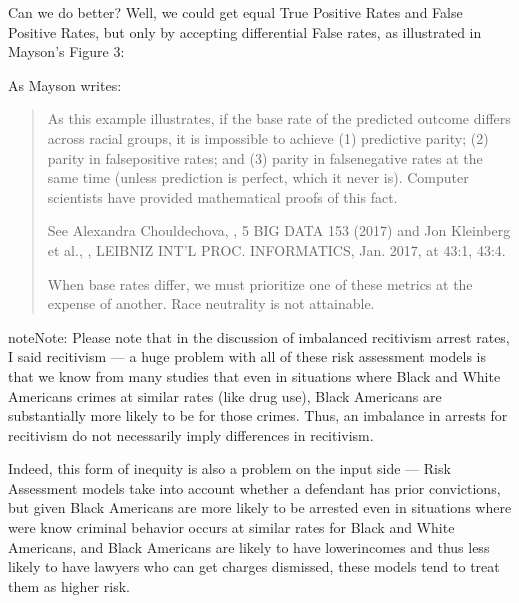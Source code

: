 \documentclass[letterpaper,10pt,english]{jupyterBook}
\begin{document}
\sphinxAtStartPar
Can we do better? Well, we could get equal True Positive Rates and False Positive Rates, but only by accepting differential False  rates, as illustrated in Mayson’s Figure 3:

\sphinxAtStartPar
{}

\sphinxAtStartPar
As Mayson writes:
\begin{quote}

\sphinxAtStartPar
As this example illustrates, if the base rate of the predicted outcome differs across racial groups, it is impossible to achieve (1) predictive parity; (2) parity in false\sphinxhyphen{}positive rates; and (3) parity in false\sphinxhyphen{}negative rates at the same time (unless prediction is perfect, which it never is). Computer scientists have provided mathematical proofs of this fact.%
\begin{footnote}[4]\sphinxAtStartFootnote
See Alexandra Chouldechova, , 5 BIG DATA 153 (2017) and Jon Kleinberg et al., , LEIBNIZ INT’L PROC. INFORMATICS, Jan. 2017, at 43:1, 43:4.
%
\end{footnote} When base rates differ, we must prioritize one of these metrics at the expense of another. Race neutrality is not attainable.
\end{quote}

\begin{sphinxadmonition}{note}{Note:}
\sphinxAtStartPar
Please note that in the discussion of imbalanced recitivism arrest rates, I said  recitivism — a huge problem with all of these risk assessment models is that we know from many studies that even in situations where Black and White Americans  crimes at similar rates (like drug use), Black Americans are substantially more likely to be  for those crimes. Thus, an imbalance in arrests for recitivism do not necessarily imply differences in  recitivism.

\sphinxAtStartPar
Indeed, this form of inequity is also a problem on the input side — Risk Assessment models take into account whether a defendant has prior convictions, but given Black Americans are more likely to be arrested even in situations where were know criminal behavior occurs at similar rates for Black and White Americans, and Black Americans are likely to have lower\sphinxhyphen{}incomes and thus less likely to have lawyers who can get charges dismissed, these models tend to treat them as higher risk.
\end{sphinxadmonition}
\end{document}
